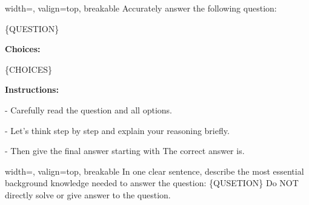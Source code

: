 \begin{bluebox}{width=\linewidth, valign=top, breakable}
Accurately answer the following question:

\vspace{0.8em}
{\ttfamily\small
\{{{QUESTION}}\}}
\vspace{0.8em}

\medskip
\noindent\textbf{Choices:}

{\ttfamily\small
\{{{CHOICES}}\}}
\vspace{0.8em}

\medskip
\noindent\textbf{Instructions:}

- Carefully read the question and all options. \vspace{0.3em}  

- Let's think step by step and explain your reasoning briefly. \vspace{0.3em}  

- Then give the final answer starting with The correct answer is. 

\end{bluebox}

\begin{bluebox}{width=\linewidth, valign=top, breakable}
In one clear sentence, describe the most essential background knowledge needed to answer the question:
{\ttfamily\small
\{{{QUSETION}}\}}
Do NOT directly solve or give answer to the question.

\end{bluebox}

